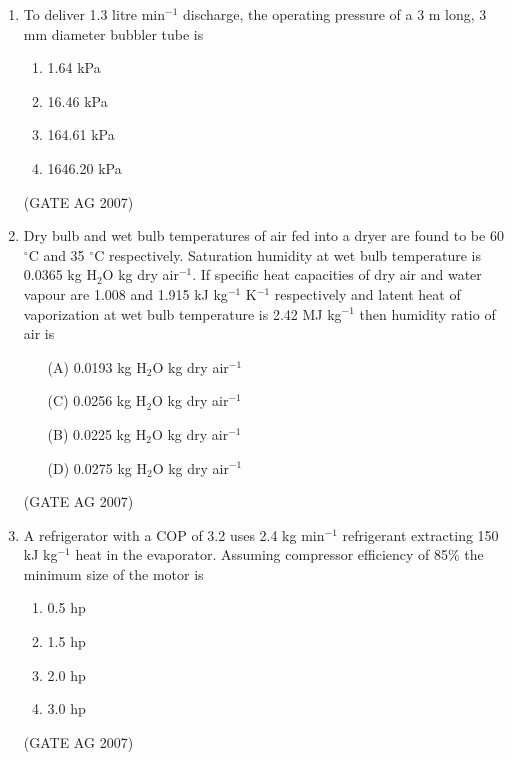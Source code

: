 \documentclass[journal,12pt,onecolumn]{IEEEtran}
\theoremstyle{remark}
\begin{document}
\begin{enumerate}[label=Q\arabic*:]
\item To deliver 1.3 litre min$^{-1}$ discharge, the operating pressure of a 3 m long, 3 mm diameter bubbler tube is
\begin{multicols}{4}
\begin{enumerate}
    \item 1.64 kPa
    \item 16.46 kPa
    \item 164.61 kPa
    \item 1646.20 kPa
\end{enumerate}
\end{multicols}
\hfill(GATE AG 2007)

\item Dry bulb and wet bulb temperatures of air fed into a dryer are found to be 60 $^{\circ}$C and 35 $^{\circ}$C respectively. Saturation humidity at wet bulb temperature is 0.0365 kg H$_2$O kg dry air$^{-1}$. If specific heat capacities of dry air and water vapour are 1.008 and 1.915 kJ kg$^{-1}$ K$^{-1}$ respectively and latent heat of vaporization at wet bulb temperature is 2.42 MJ kg$^{-1}$ then humidity ratio of air is
\begin{multicols}{2}
\begin{enumerate}
    \item[(A)] 0.0193 kg H$_2$O kg dry air$^{-1}$
   \item[(C)] 0.0256 kg H$_2$O kg dry air$^{-1}$
    \item[(B)] 0.0225 kg H$_2$O kg dry air$^{-1}$
    \item[(D)] 0.0275 kg H$_2$O kg dry air$^{-1}$
\end{enumerate}
\end{multicols}
\hfill(GATE AG 2007)

\item A refrigerator with a COP of 3.2 uses 2.4 kg min$^{-1}$ refrigerant extracting 150 kJ kg$^{-1}$ heat in the evaporator. Assuming compressor efficiency of 85\% the minimum size of the motor is
\begin{multicols}{4}
\begin{enumerate}
    \item 0.5 hp
    \item 1.5 hp
    \item 2.0 hp
    \item 3.0 hp
\end{enumerate}
\end{multicols}
\hfill(GATE AG 2007)


\end{enumerate}
\end{document}
